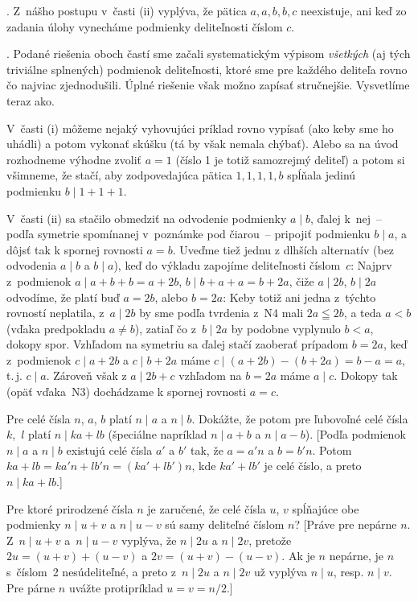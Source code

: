 {.
Z~nášho postupu v~časti (ii) vyplýva, že
pätica $a,a,b,b,c$ neexistuje, ani
keď zo zadania úlohy vynecháme podmienky deliteľnosti
číslom $c$.

.
Podané riešenia oboch častí sme začali
systematickým výpisom {\it všetkých\/} (aj tých triviálne splnených)
podmienok deliteľnosti, ktoré sme pre každého deliteľa rovno čo
najviac zjednodušili. Úplné riešenie však možno zapísať stručnejšie.
Vysvetlíme teraz ako.

V~časti (i) môžeme nejaký vyhovujúci príklad rovno vypísať
(ako keby sme ho uhádli) a potom vykonať skúšku (tá by však nemala chýbať).
Alebo sa na úvod rozhodneme výhodne zvoliť $a=1$
(číslo 1 je totiž samozrejmý deliteľ)
a potom si všimneme, že stačí,
aby zodpovedajúca pätica $1,1,1,1,b$ spĺňala
jedinú podmienku $b\mid 1+1+1$.

V~časti (ii) sa stačilo obmedziť na odvodenie podmienky $a\mid b$,
ďalej k~nej~-- podľa symetrie spomínanej v~poznámke pod čiarou~--
pripojiť podmienku $b\mid a$, a dôjsť tak k spornej rovnosti $a=b$.
Uveďme tiež jednu z dlhších alternatív (bez
odvodenia $a\mid b$ a $b\mid a$),
keď do výkladu zapojíme deliteľnosti číslom~$c$:
Najprv z~podmienok $a \mid a+b+b=a+2b$, $b \mid b+a+a=b+2a$,
čiže $a\mid2b$, $b\mid2a$ odvodíme,
že platí buď $a=2b$, alebo $b=2a$: Keby totiž ani
jedna z~týchto rovností neplatila, z~$a\mid2b$ by sme podľa
tvrdenia z~N4 mali
$2a\leqq 2b$, a teda $a<b$ (vďaka predpokladu $a\ne b$),
zatiaľ čo z~$b\mid2a$ by podobne vyplynulo $b<a$, dokopy spor.
Vzhľadom na symetriu
sa ďalej stačí zaoberať prípadom $b=2a$,
keď z~podmienok $c\mid a+2b$ a $c\mid b+2a$ máme
$c\mid(a+2b)-(b+2a)=b-a=a$, t.\,j. $c\mid a$. Zároveň však
z $a\mid 2b+c$ vzhľadom na $b=2a$ máme $a\mid c$. Dokopy
tak (opäť vďaka~N3) dochádzame k spornej rovnosti $a=c$.


Pre celé čísla $n$, $a$, $b$ platí $n\mid a$ a $n\mid b$.
Dokážte, že potom pre ľubovoľné celé čísla $k$,~$l$ platí
$n\mid ka+lb$ (špeciálne napríklad $n\mid a+b$ a $n\mid a-b$).
[Podľa podmienok $n\mid a$ a $n\mid b$ existujú celé čísla
$a'$ a $b'$ tak, že $a=a'n$ a $b=b'n$. Potom $ka+lb=ka'n+lb'n=
(ka'+lb')n$, kde $ka'+lb'$ je celé číslo, a preto $n\mid ka+lb$.]

Pre ktoré prirodzené čísla $n$ je zaručené, že celé čísla $u$, $v$
spĺňajúce obe podmienky $n\mid u+v$ a $n\mid u-v$ sú samy
deliteľné číslom $n$?
[Práve pre nepárne $n$. Z~$n\mid u+v$ a~$n\mid u-v$ vyplýva,
že $n\mid 2u$ a $n\mid 2v$, pretože $2u=(u+v)+(u-v)$ a
$2v=(u+v)-(u-v)$. Ak je $n$ nepárne, je $n$ s~číslom~2 nesúdeliteľné,
a preto z~$n\mid 2u$ a $n\mid 2v$ už vyplýva $n\mid u$, resp. $n\mid v$.
Pre párne $n$ uvážte protipríklad $u=v=n/2$.]

}
